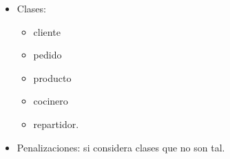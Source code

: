 \documentclass[11pt,letterpaper]{article}
\begin{document}
\begin{spacing}{1.2}
\begin{NewAnswer}
\begin{itemize}
        \begin{itemize}
            \item Clases:
            \begin{itemize}
                \item cliente
                \item pedido
                \item producto
                \item cocinero
                \item repartidor.
            \end{itemize}
            \item Penalizaciones: si considera clases que no son tal.
        \end{itemize}
    \end{itemize}
\end{NewAnswer}

\end{spacing}
\end{document}
